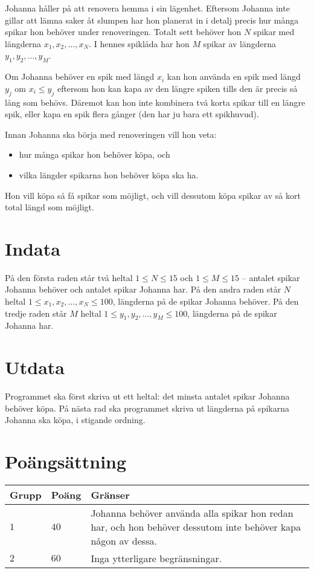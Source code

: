 \noindent
Johanna håller på att renovera hemma i sin lägenhet.
Eftersom Johanna inte gillar att lämna saker åt slumpen har hon planerat 
in i detalj precis hur många spikar hon behöver under renoveringen.
Totalt sett behöver hon $N$ spikar med längderna $x_1, x_2, \dots, x_N$.
I hennes spiklåda har hon $M$ spikar av längderna $y_1, y_2, \dots, y_M$.

Om Johanna behöver en spik med längd $x_i$ kan hon använda en spik med 
längd $y_j$ om $x_i \le y_j$ eftersom hon kan kapa av den längre spiken 
tills den är precis så lång som behövs.
Däremot kan hon inte kombinera två korta spikar till en längre spik, 
eller kapa en spik flera gånger (den har ju bara ett spikhuvud).

Innan Johanna ska börja med renoveringen vill hon veta:
\begin{itemize}
    \item hur många spikar hon behöver köpa, och
    \item vilka längder spikarna hon behöver köpa ska ha.
\end{itemize}

Hon vill köpa så få spikar som möjligt, och vill dessutom 
köpa spikar av så kort total längd som möjligt.

\section*{Indata}
På den första raden står två heltal $1 \le N \le 15$ och $1 \le M \le 15$ -- antalet spikar Johanna behöver och antalet spikar Johanna har.
På den andra raden står $N$ heltal $1 \le x_1, x_2, \dots, x_N \le 100$, längderna på de spikar Johanna behöver.
På den tredje raden står $M$ heltal $1 \le y_1, y_2, \dots, y_M \le 100$, längderna på de spikar Johanna har.

\section*{Utdata}
Programmet ska först skriva ut ett heltal: det minsta antalet spikar Johanna behöver köpa.
På nästa rad ska programmet skriva ut längderna på spikarna Johanna ska köpa, i stigande ordning.

\section*{Poängsättning}
\noindent
\begin{tabular}{| l | l | p{12cm} |}
  \hline
  \textbf{Grupp} & \textbf{Poäng} & \textbf{Gränser} \\ \hline
  $1$    & $40$       & Johanna behöver använda alla spikar hon redan har, 
  och hon behöver dessutom inte behöver kapa någon av dessa. \\ \hline
  $2$    & $60$       & Inga ytterligare begränsningar. \\ \hline
\end{tabular}

